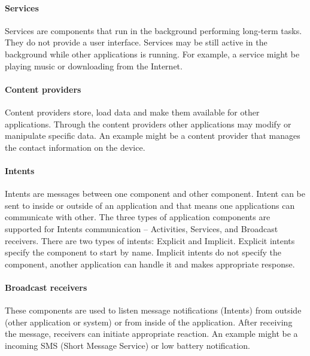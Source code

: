 \paragraph{Services}
Services are components that run in the background performing long-term tasks. They do not provide a user interface. Services may be still active in the background while other applications is running. For example, a service might be playing music or downloading from the Internet.

\paragraph{Content providers}
Content providers store, load data and make them available for other applications. Through the content providers other applications may modify or manipulate specific data. An example might be a content provider that manages the contact information on the device.

\paragraph{Intents}
Intents are messages between one component and other component. Intent can be sent to inside or outside of an application and that means one applications can communicate with other. The three types of application components are supported for Intents communication -- Activities, Services, and Broadcast receivers. There are two types of intents: Explicit and Implicit. Explicit intents specify the component to start by name. Implicit intents do not specify the component, another application can handle it and makes appropriate response.

\paragraph{Broadcast receivers}
These components are used to listen message notifications (Intents) from outside (other application or system) or from inside of the application. After receiving the message, receivers can initiate appropriate reaction. An example might be a incoming SMS (Short Message Service) or low battery notification.

